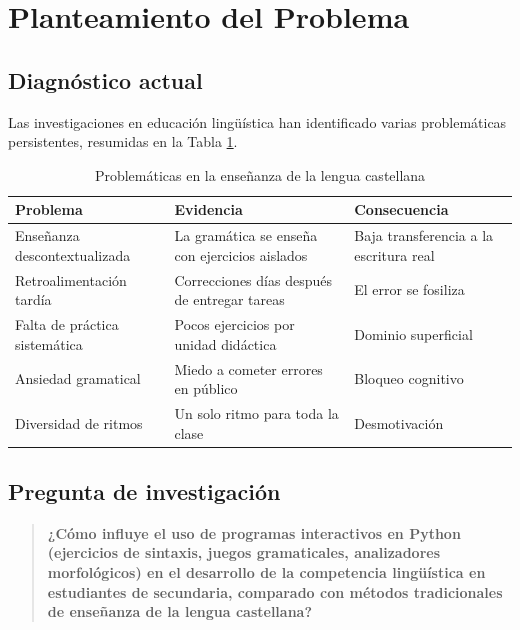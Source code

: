 \documentclass[12pt,spanish]{article}
\begin{document}
\tableofcontents
\newpage

\listoftables
\listoffigures
\newpage

\section{Planteamiento del Problema}

\subsection{Diagnóstico actual}

Las investigaciones en educación lingüística han identificado varias problemáticas persistentes, resumidas en la Tabla \ref{tab:problemas}.

\begin{table}[H]
\centering
\caption{Problemáticas en la enseñanza de la lengua castellana}
\label{tab:problemas}
\begin{tabular}{|p{4cm}|p{6cm}|p{4cm}|}
\hline
\textbf{Problema} & \textbf{Evidencia} & \textbf{Consecuencia} \\
\hline
Enseñanza descontextualizada & La gramática se enseña con ejercicios aislados & Baja transferencia a la escritura real \\
\hline
Retroalimentación tardía & Correcciones días después de entregar tareas & El error se fosiliza \\
\hline
Falta de práctica sistemática & Pocos ejercicios por unidad didáctica & Dominio superficial \\
\hline
Ansiedad gramatical & Miedo a cometer errores en público & Bloqueo cognitivo \\
\hline
Diversidad de ritmos & Un solo ritmo para toda la clase & Desmotivación \\
\hline
\end{tabular}
\end{table}

\subsection{Pregunta de investigación}

\begin{quote}
\textbf{¿Cómo influye el uso de programas interactivos en Python (ejercicios de sintaxis, juegos gramaticales, analizadores morfológicos) en el desarrollo de la competencia lingüística en estudiantes de secundaria, comparado con métodos tradicionales de enseñanza de la lengua castellana?}
\end{quote}
\end{document}
